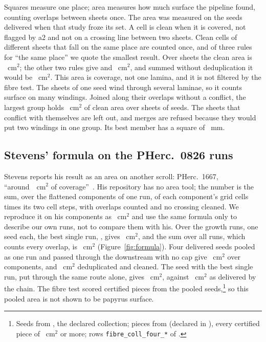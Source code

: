 Squares measure one place; area measures how much surface the pipeline found, counting overlaps between sheets once.
The area was measured on the \AreaSeeds{} seeds delivered when that study froze its set. A cell is clean when it is
covered, not flagged by a2 and not on a crossing line between two sheets. Clean cells of different sheets that fall on
the same place are counted once, and of three rules for ``the same place'' we quote the smallest result. Over
\UnionSheets{} sheets the clean area is \UnionOneStep{}~cm$^2$; the other two rules give \UnionHalfStep{} and
\UnionBinMax{}~cm$^2$, and summed without deduplication it would be \UnionCleanSummed{}~cm$^2$. This area is coverage,
not one lamina, and it is not filtered by the fibre test. The sheets of one seed wind through several laminae, so it
counts surface on many windings. Joined along their overlaps without a conflict, the largest group holds
\LaminaGroup{}~cm$^2$ of clean area over \LaminaGroupSheets{} sheets of \LaminaGroupSeeds{} seeds. The \LaminaWrapping{}
sheets that conflict with themselves are left out, and \LaminaRefusals{} merges are refused because they would put two
windings in one group. Its best member has a square of \LaminaGroupSquare{}~mm.

\subsection{Stevens' formula on the PHerc.~0826 runs}
\label{sec:formula}

Stevens reports his result as an area on another scroll: PHerc.~1667, ``around~\StevensQuoted{}~cm$^2$ of
coverage''~\cite{winners}. His repository has no area tool; the number is the sum, over the \StevensComponents{}
flattened components of one run, of each component's grid cells times its two cell steps, with overlaps counted and no
crossing cleaned. We reproduce it on his components as \StevensRepro{}~cm$^2$ and use the same formula only to describe
our own runs, not to compare them with his. Over the \FormulaRuns{} growth runs, one seed each, the best single run,
\FormulaBestRunSeed{}, gives \FormulaBestRun{}~cm$^2$, and the sum over all runs, which counts every overlap, is
\FormulaSumRuns{}~cm$^2$ (Figure~\ref{fig:formula}). Four delivered seeds pooled as one run and passed through the
downstream with no cap give \CollFourFormula{}~cm$^2$ over \CollFourSheets{} components, and \CollFourUnion{}~cm$^2$
deduplicated and cleaned. The seed with the best single run, put through the same route alone, gives
\CollControlFormula{}~cm$^2$, against \DeliveredSixThreeSixFive{}~cm$^2$ as delivered by the chain. The fibre test
scored \FibreCollFourPiecesRanked{} certified pieces from the \FibreCollFourSeeds{} pooled seeds,\footnote{Seeds from
, the declared collection; pieces from  (declared in ),
every certified piece of \FibrePopulationMin{}~cm$^2$ or more; rows \texttt{fibre\_coll\_four\_*} of
.} so this pooled area is not shown to be papyrus surface.

